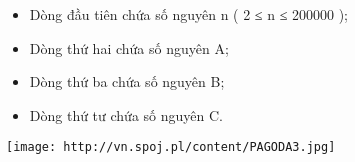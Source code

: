 \begin{itemize}
	\item Dòng đầu tiên chứa số nguyên n ( 2 ≤ n ≤ 200000 );
	\item Dòng thứ hai chứa số nguyên A;
	\item Dòng thứ ba chứa số nguyên B;
	\item Dòng thứ tư chứa số nguyên C.
\end{itemize}


\texttt{[image: http://vn.spoj.pl/content/PAGODA3.jpg]}
